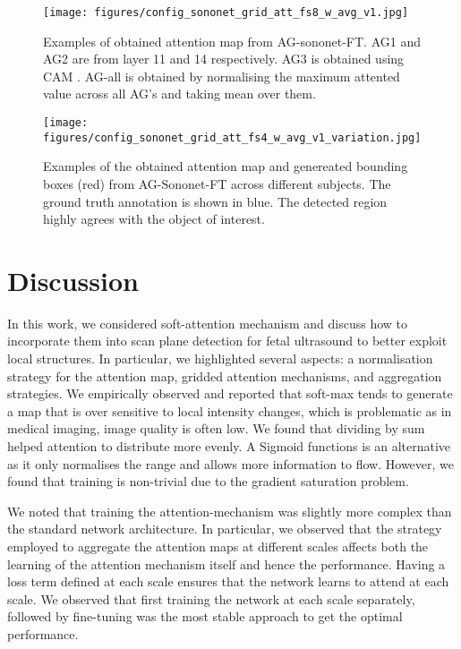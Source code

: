 \documentclass{article}
\begin{document}
\begin{figure}[!t]
	\centering
	\texttt{[image: figures/config\_sononet\_grid\_att\_fs8\_w\_avg\_v1.jpg]}
	\caption{Examples of obtained attention map from AG-sononet-FT. AG1 and AG2 are from layer 11 and 14 respectively. AG3 is obtained using CAM  \cite{zhou2016learning}. AG-all is obtained by normalising the maximum attented value across all AG's and taking mean over them.}
	\label{fig:attention_ag_sononet_ds}
\end{figure}

\begin{figure}[!t]
	\centering
	\texttt{[image: figures/config\_sononet\_grid\_att\_fs4\_w\_avg\_v1\_variation.jpg]}
	\caption{Examples of the obtained attention map and genereated bounding boxes (red) from AG-Sononet-FT across different subjects. The ground truth annotation is shown in blue. The detected region highly agrees with the object of interest.}
	\label{fig:attention_ag_sononet_ds_variation}
\end{figure}

\section{Discussion}

In this work, we considered soft-attention mechanism and discuss how to incorporate them into scan plane detection for fetal ultrasound to better exploit local structures. In particular, we highlighted several aspects: a normalisation strategy for the attention map, gridded attention mechanisms, and aggregation strategies. We empirically observed and reported that soft-max tends to generate a map that is over sensitive to local intensity changes, which is problematic as in medical imaging, image quality is often low. We found that dividing by sum helped attention to distribute more evenly. A Sigmoid functions is an alternative as it only normalises the range and allows more information to flow. However, we found that training is non-trivial due to the gradient saturation problem.

We noted that training the attention-mechanism was slightly more complex than the standard network architecture. In particular, we observed that the strategy employed to aggregate the attention maps at different scales affects both the learning of the attention mechanism itself and hence the performance. Having a loss term defined at each scale ensures that the network learns to attend at each scale. We observed that first training the network at each scale separately, followed by fine-tuning was the most stable approach to get the optimal performance.
\end{document}
